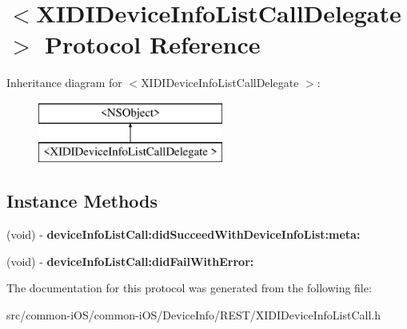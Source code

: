 \hypertarget{protocol_x_i_d_i_device_info_list_call_delegate_01-p}{}\section{$<$X\+I\+D\+I\+Device\+Info\+List\+Call\+Delegate $>$ Protocol Reference}
\label{protocol_x_i_d_i_device_info_list_call_delegate_01-p}
Inheritance diagram for $<$X\+I\+D\+I\+Device\+Info\+List\+Call\+Delegate $>$\+:\begin{figure}[H]
\begin{center}
\leavevmode
\includegraphics[height=2.000000cm]{protocol_x_i_d_i_device_info_list_call_delegate_01-p}
\end{center}
\end{figure}
\subsection*{Instance Methods}
\begin{DoxyCompactItemize}
\item 
\hypertarget{protocol_x_i_d_i_device_info_list_call_delegate_01-p_aaa5a03227670c1bc146085a235d86c3f}{}\label{protocol_x_i_d_i_device_info_list_call_delegate_01-p_aaa5a03227670c1bc146085a235d86c3f} 
(void) -\/ {\bfseries device\+Info\+List\+Call\+:did\+Succeed\+With\+Device\+Info\+List\+:meta\+:}
\item 
\hypertarget{protocol_x_i_d_i_device_info_list_call_delegate_01-p_a1f5e4f45df5576e86ab8bf97f75d4ae4}{}\label{protocol_x_i_d_i_device_info_list_call_delegate_01-p_a1f5e4f45df5576e86ab8bf97f75d4ae4} 
(void) -\/ {\bfseries device\+Info\+List\+Call\+:did\+Fail\+With\+Error\+:}
\end{DoxyCompactItemize}


The documentation for this protocol was generated from the following file\+:\begin{DoxyCompactItemize}
\item 
src/common-\/i\+O\+S/common-\/i\+O\+S/\+Device\+Info/\+R\+E\+S\+T/X\+I\+D\+I\+Device\+Info\+List\+Call.\+h\end{DoxyCompactItemize}
